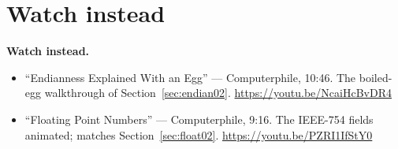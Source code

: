 \section*{Watch instead}
\label{sec:watch02}

\begin{rulebox}
\textbf{Watch instead.}
\begin{itemize}
  \item ``Endianness Explained With an Egg'' --- Computerphile, 10:46.
        The boiled-egg walkthrough of Section~\ref{sec:endian02}.
        \url{https://youtu.be/NcaiHcBvDR4}
  \item ``Floating Point Numbers'' --- Computerphile, 9:16. The
        IEEE-754 fields animated; matches Section~\ref{sec:float02}.
        \url{https://youtu.be/PZRI1IfStY0}
\end{itemize}
\end{rulebox}

\chapternotes
